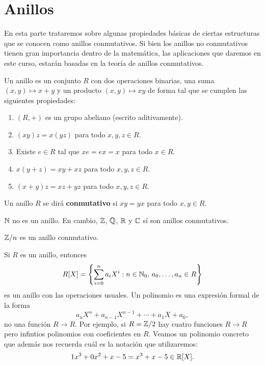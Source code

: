 \chapter{Anillos}

En esta parte trataremos sobre algunas propiedades básicas de ciertas
estructuras que se conocen como anillos conmutativos. Si bien los anillos no conmutativos tienen gran importancia dentro de la matemática, 
las aplicaciones que daremos en este curso, estarán basadas en la teoría de anillos conmutativos.

\begin{definition}
Un anillo es un conjunto $R$ con dos operaciones binarias, una suma $(x,y)\mapsto x+y$ y un producto $(x,y)\mapsto xy$ de forma tal que  
se cumplen las siguientes propiedades:
\begin{enumerate}
\item $(R,+)$ es un grupo abeliano (escrito aditivamente).
\item $(xy)z=x(yz)$ para todo $x,y,z\in R$.
\item Existe $e\in R$ tal que $xe=ex=x$ para todo $x\in R$.
\item $x(y+z)=xy+xz$ para todo $x,y,z\in R$.
\item $(x+y)z=xz+yz$ para todo $x,y,z\in R$.
\end{enumerate}
\end{definition}

\begin{definition}
Un anillo $R$ se dirá \textbf{conmutativo} si $xy=yx$ para todo $x,y\in R$.
\end{definition}

\begin{examples}
$\mathbb{N}$ no es un anillo. En cambio, 
$\mathbb{Z}$, $\mathbb{Q}$, $\mathbb{R}$ y $\mathbb{C}$ sí son anillos conmutativos.
\end{examples}

\begin{example}
$\mathbb{Z}/n$ es un anillo conmutativo.
\end{example}

\begin{example}
Si $R$ es un anillo, entonces 
\[
R[X]=\left\{\sum_{i=0}^n a_iX^i:n\in\mathbb{N}_0,\,a_0,\dots,a_n\in R\right\}
\]
es un anillo con las operaciones usuales. Un polinomio es una expresión formal 
de la forma 
\[
a_nX^n+a_{n-1}X^{n-1}+\cdots+a_1X+a_0,
\]
no una función $R\to R$. 
Por ejemplo, si $R=\mathbb{Z}/2$ hay cuatro funciones $R\to R$ 
pero infintios polinomios con coeficientes en $R$. Veamos un polinomio concreto que 
además nos recuerda cuál es la notación que utilizaremos:
\[
1x^3+0x^2+x-5=x^3+x-5\in\mathbb{R}[X].
\]
\end{example}

